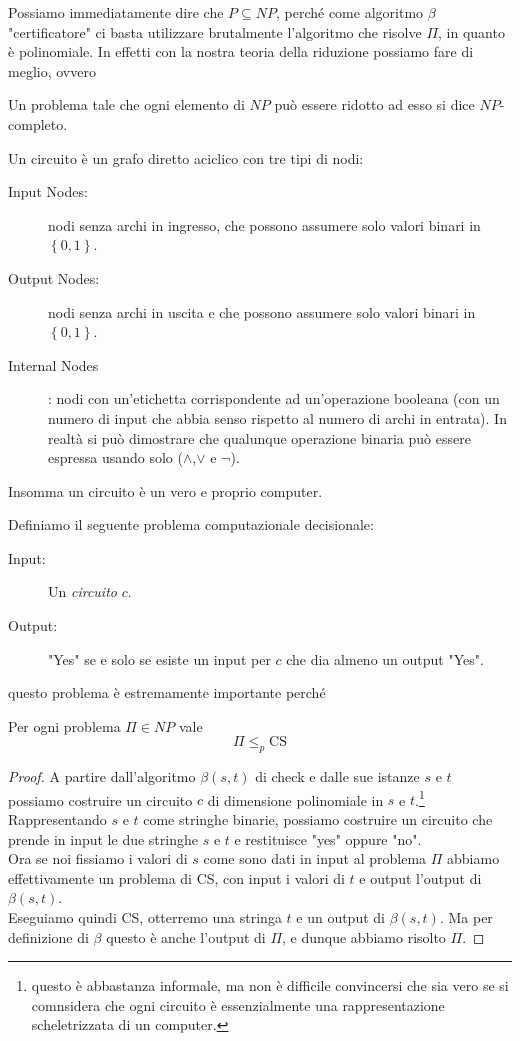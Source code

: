 \documentclass[11pt]{scrartcl}
\begin{document}
	Possiamo immediatamente dire che $P\subseteq NP$, perché come algoritmo $\beta$ "certificatore" ci basta utilizzare brutalmente l'algoritmo che risolve $\Pi$, in quanto è polinomiale. In effetti con la nostra teoria della riduzione possiamo fare di meglio, ovvero
	\begin{definition}
		Un problema tale che ogni elemento di $NP$ può essere ridotto ad esso si dice $NP$-completo.
	\end{definition}
	\begin{definition}[Circuito]
		Un circuito è un grafo diretto aciclico con tre tipi di nodi:
		\begin{description}
			\item[Input Nodes:] nodi senza archi in ingresso, che possono assumere solo valori binari in $\left\{0,1\right\}$.
			\item[Output Nodes:] nodi senza archi in uscita e che possono assumere solo valori binari in $\left\{0,1\right\}$.
			\item[Internal Nodes]: nodi con un'etichetta corrispondente ad un'operazione booleana (con un numero di input che abbia senso rispetto al numero di archi in entrata). In realtà si può dimostrare che qualunque operazione binaria può essere espressa usando solo ($\land$,$\lor$ e $\lnot$).
		\end{description} 
		Insomma un circuito è un vero e proprio computer.
	\end{definition}
	\begin{example}
		Definiamo il seguente problema computazionale decisionale:
		\begin{description}
			\item[Input:] Un \textit{circuito} $c$.
			\item[Output:] "Yes" se e solo se esiste un input per $c$ che dia almeno un output "Yes". 
		\end{description}
	\end{example}
	questo problema è estremamente importante perché
	\begin{lemma}[CS è $NP$-completo]
		Per ogni problema $\Pi\in NP$ vale 
		$$\Pi\le_p \text{CS}$$
	\end{lemma} 
	\begin{proof}
		A partire dall'algoritmo $\beta(s,t)$ di check e dalle sue istanze $s$ e $t$ possiamo costruire un circuito $c$ di dimensione polinomiale in $s$ e $t$.\footnote{questo è abbastanza informale, ma non è difficile convincersi che sia vero se si comnsidera che ogni circuito è essenzialmente una rappresentazione scheletrizzata di un computer.} Rappresentando $s$ e $t$ come stringhe binarie, possiamo costruire un circuito che prende in input le due stringhe $s$ e $t$ e restituisce "yes" oppure "no". \\
		Ora se noi fissiamo i valori di $s$ come sono dati in input al problema $\Pi$ abbiamo effettivamente un problema di CS, con input i valori di $t$ e output l'output di $\beta(s,t)$. \\
		Eseguiamo quindi CS, otterremo una stringa $t$ e un output di $\beta(s,t)$. Ma per definizione di $\beta$ questo è anche l'output di $\Pi$, e dunque abbiamo risolto $\Pi$.
	\end{proof}
\end{document}

